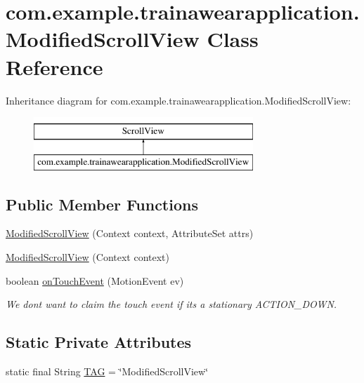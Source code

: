 \hypertarget{classcom_1_1example_1_1trainawearapplication_1_1_modified_scroll_view}{}\section{com.\+example.\+trainawearapplication.\+Modified\+Scroll\+View Class Reference}
\label{classcom_1_1example_1_1trainawearapplication_1_1_modified_scroll_view}
Inheritance diagram for com.\+example.\+trainawearapplication.\+Modified\+Scroll\+View\+:\begin{figure}[H]
\begin{center}
\leavevmode
\includegraphics[height=2.000000cm]{classcom_1_1example_1_1trainawearapplication_1_1_modified_scroll_view}
\end{center}
\end{figure}
\subsection*{Public Member Functions}
\begin{DoxyCompactItemize}
\item 
\mbox{\hyperlink{classcom_1_1example_1_1trainawearapplication_1_1_modified_scroll_view_a54164bcc307ead282e4a872882790ba1}{Modified\+Scroll\+View}} (Context context, Attribute\+Set attrs)
\item 
\mbox{\hyperlink{classcom_1_1example_1_1trainawearapplication_1_1_modified_scroll_view_a60a3e71da3963714f6ec401034a80c6f}{Modified\+Scroll\+View}} (Context context)
\item 
boolean \mbox{\hyperlink{classcom_1_1example_1_1trainawearapplication_1_1_modified_scroll_view_a1183afa31872d9cddf72b967d2db4f12}{on\+Touch\+Event}} (Motion\+Event ev)
\begin{DoxyCompactList}\small\item\em We don\textquotesingle{}t want to claim the touch event if it\textquotesingle{}s a stationary A\+C\+T\+I\+O\+N\+\_\+\+D\+O\+WN. \end{DoxyCompactList}\end{DoxyCompactItemize}
\subsection*{Static Private Attributes}
\begin{DoxyCompactItemize}
\item 
static final String \mbox{\hyperlink{classcom_1_1example_1_1trainawearapplication_1_1_modified_scroll_view_aa8c3ba8f3bb238ac0f2d56e82757814a}{T\+AG}} = \char`\"{}Modified\+Scroll\+View\char`\"{}
\end{DoxyCompactItemize}



